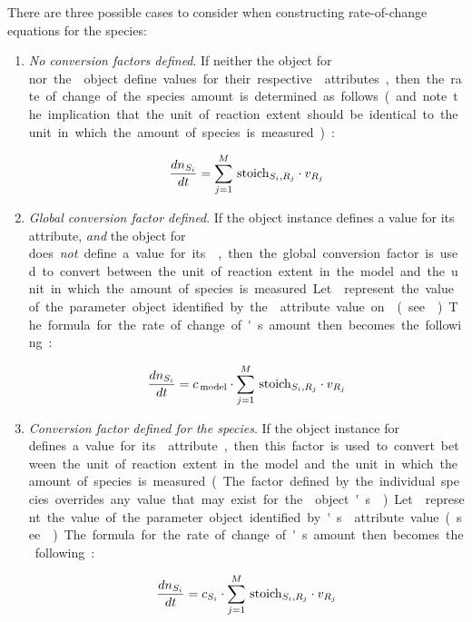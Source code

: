 There are three possible cases to consider when constructing
rate-of-change equations for the species:
\begin{enumerate}\setlength{\parskip}{-0.2ex}

\item \emph{No conversion factors defined}.  If neither the
  \Species object for \si nor the \Model object define values for
  their respective  attributes, then the
  rate of change of the species amount is determined as follows
  (and note the implication that the unit of reaction extent should
  be identical to the unit in which the amount of species \si is
  measured):
  \begin{linenomath}
    \begin{equation*}
      \frac{d n_{S_i}}{dt} = \sum_{j=1}^{M} \, \textrm{stoich}_{S_{i},R_{j}} \cdot v_{R_j} 
    \end{equation*}
  \end{linenomath}

\item \emph{Global conversion factor defined}.  If the \Model
  object instance defines a value for its 
  attribute, \emph{and} the \Species object for \si does
  \emph{not} define a value for its , then
  the global conversion factor is used to convert between the unit
  of reaction extent in the model and the unit in which the amount
  of species \si is measured.  Let \csg represent the value of the
  parameter object identified by the 
  attribute value on \Model (see
  ).  The formula for the
  rate of change of \si's amount then becomes the following:
  \begin{linenomath}
    \begin{equation*}
      \frac{d n_{S_i}}{dt} = c_{\,\textrm{model}} \cdot \sum_{j=1}^{M} \, \textrm{stoich}_{S_{i},R_{j}} \cdot v_{R_j} 
    \end{equation*}
  \end{linenomath}

\item \emph{Conversion factor defined for the species}.  If the
  \Species object instance for \si defines a value for its
   attribute, then this factor is used to
  convert between the unit of reaction extent in the model and the
  unit in which the amount of species \si is measured.  (The
  factor defined by the individual species overrides any value
  that may exist for the \Model object's
  .)  Let \csi represent the value of the
  parameter object identified by \si's 
  attribute value (see ).  The
  formula for the rate of change of \si's amount then becomes the
  following:
  \begin{linenomath}
    \begin{equation*}
      \frac{d n_{S_i}}{dt} = c_{S_i} \cdot \sum_{j=1}^{M} \, \textrm{stoich}_{S_{i},R_{j}} \cdot v_{R_j} 
    \end{equation*}
  \end{linenomath}

\end{enumerate}

